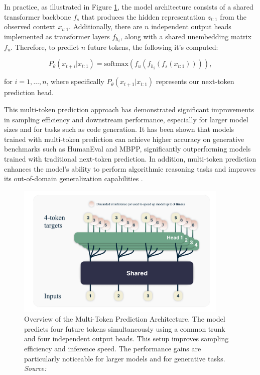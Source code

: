 In practice, as illustrated in Figure \ref{fig:multi-token-prediction}, the model architecture consists of a shared transformer backbone \( f_s \) that produces the hidden representation \( z_{t:1} \) from the observed context \( x_{t:1} \). Additionally, there are \( n \) independent output heads implemented as transformer layers \( f_{h_i} \), along with a shared unembedding matrix \( f_u \). Therefore, to predict \( n \) future tokens, the following it's computed:

\begin{equation}
    P_\theta(x_{t+i} | x_{t:1}) = \text{softmax}(f_u(f_{h_i}(f_s(x_{t:1})))),
\end{equation}

for \( i = 1, \ldots, n \), where specifically \( P_\theta(x_{t+1} | x_{t:1}) \) represents our next-token prediction head.

This multi-token prediction approach has demonstrated significant improvements in sampling efficiency and downstream performance, especially for larger model sizes and for tasks such as code generation. It has been shown that models trained with multi-token prediction can achieve higher accuracy on generative benchmarks such as HumanEval and MBPP, significantly outperforming models trained with traditional next-token prediction. In addition, multi-token prediction enhances the model's ability to perform algorithmic reasoning tasks and improves its out-of-domain generalization capabilities \cite{gloeckle2024better}.

\begin{figure}[h]
    \centering
    \includegraphics[width=0.9\textwidth]{images/llms/multi-token-pred-architecture.png}
    \caption{Overview of the Multi-Token Prediction Architecture. The model predicts four future tokens simultaneously using a common trunk and four independent output heads. This setup improves sampling efficiency and inference speed. The performance gains are particularly noticeable for larger models and for generative tasks. \textit{Source:} \cite{gloeckle2024better}}
    \label{fig:multi-token-prediction}
\end{figure}

